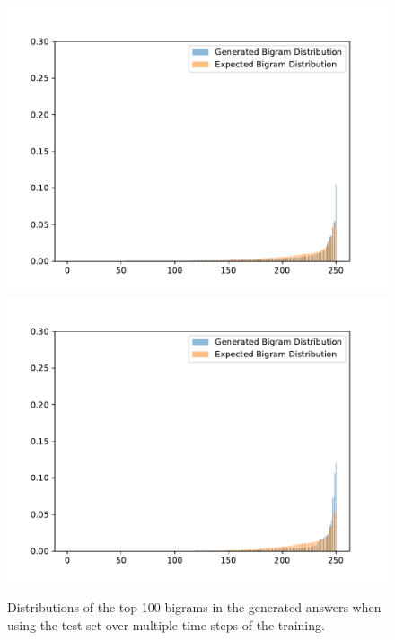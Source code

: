 \begin{figure}[H]
	\includegraphics[width=\linewidth]{img/plots/opensubtitles_not_reversed/bigram_distribution_comparison_step_2500000.pdf}
	\centering
	\small
	\endminipage\hfill
	\includegraphics[width=\linewidth]{img/plots/opensubtitles_not_reversed/bigram_distribution_comparison_step_3000000.pdf}
	\centering
	\small
	\endminipage\hfill
	\caption{Distributions of the top 100 bigrams in the generated answers when using the test set over multiple time steps of the training.}
	\label{results:ngram:distributions:opensubtitles}
\end{figure}

